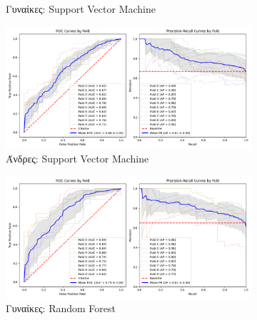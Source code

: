 \documentclass[12pt]{report}
\begin{document}
\begin{figure}[H]
\begin{subfigure}[b]{0.48\textwidth}
                        \caption{Γυναίκες: Support Vector Machine}
                        \label{stratified_Female_50-70_SVM_useSMOTE_False_k_fold_validation}
                    \end{subfigure}
                    \hfill
                    \begin{subfigure}[b]{0.48\textwidth}
                        \includegraphics[width=\textwidth]{ML/CV/stratified_Male_50-70_SVM_useSMOTE_False_k_fold_validation.png}
                        \caption{Άνδρες: Support Vector Machine}
                        \label{stratified_Male_50-70_SVM_useSMOTE_False_k_fold_validation}
                    \end{subfigure}
                    \vspace{0.5cm}
                    \begin{subfigure}[b]{0.48\textwidth}
                        \includegraphics[width=\textwidth]{ML/CV/stratified_Female_50-70_RF_useSMOTE_False_k_fold_validation.png}
                        \caption{Γυναίκες: Random Forest}
                        \label{stratified_Female_50-70_RF_useSMOTE_False_k_fold_validation}
                    \end{subfigure}
                    \hfill
                    \begin{subfigure}[b]{0.48\textwidth}

\end{subfigure}
\end{figure}
\end{document}
